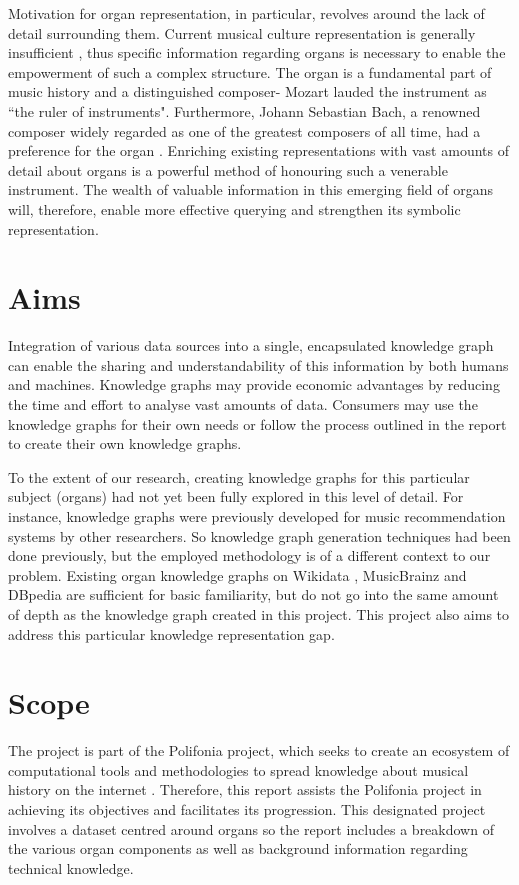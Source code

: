 Motivation for organ representation, in particular, revolves around the lack of detail surrounding them. Current musical culture representation is generally insufficient \cite{polifoniaproject}, thus specific information regarding organs is necessary to enable the empowerment of such a complex structure. The organ is a fundamental part of music history and a distinguished composer- Mozart lauded the instrument as ``the ruler of instruments". Furthermore, Johann Sebastian Bach, a renowned composer widely regarded as one of the greatest composers of all time, had a preference for the organ \cite{wolff2011organs}. Enriching existing representations with vast amounts of detail about organs is a powerful method of honouring such a venerable instrument. The wealth of valuable information in this emerging field of organs will, therefore, enable more effective querying and strengthen its symbolic representation. 

\section{Aims}
\hspace{0.5cm} Integration of various data sources into a single, encapsulated knowledge graph can enable the sharing and understandability of this information by both humans and machines. Knowledge graphs may provide economic advantages by reducing the time and effort to analyse vast amounts of data. Consumers may use the knowledge graphs for their own needs or follow the process outlined in the report to create their own knowledge graphs.

To the extent of our research, creating knowledge graphs for this particular subject (organs) had not yet been fully explored in this level of detail. For instance, knowledge graphs were previously developed for music recommendation systems \cite{oramas2016sound} by other researchers. So knowledge graph generation techniques had been done previously, but the employed methodology is of a different context to our problem. Existing organ knowledge graphs on Wikidata \cite{organwikidata}, MusicBrainz \cite{organmusicbrainz} and DBpedia \cite{organdbpedia} are sufficient for basic familiarity, but do not go into the same amount of depth as the knowledge graph created in this project. This project also aims to address this particular knowledge representation gap. 

\section{Scope}
\hspace{0.5cm} The project is part of the Polifonia project, which seeks to create an ecosystem of computational tools and methodologies to spread knowledge about musical history on the internet \cite{polifoniaproject}. Therefore, this report assists the Polifonia project in achieving its objectives and facilitates its progression. This designated project involves a dataset centred around organs so the report includes a breakdown of the various organ components as well as background information regarding technical knowledge. 

